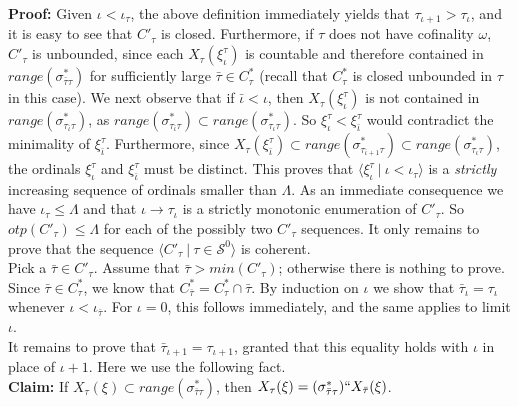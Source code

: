 \documentclass[12pt]{article}
\begin{document}
\textbf{Proof:}  Given $\iota < \iota_\tau$, the above definition immediately yields that $\tau_{\iota + 1} > \tau_\iota$, and it is easy to see that $C'_\tau$ is closed.  Furthermore, if $\tau$ does not have cofinality $\omega$, $C'_\tau$ is unbounded, since each $X_\tau ( \xi_\iota^\tau )$ is countable and therefore contained in $range ( \sigma_{\bar{\tau} \tau }^* )$ for sufficiently large $\bar{\tau} \in C_\tau^*$ (recall that $C_\tau^*$ is closed unbounded in $\tau$ in this case).  We next observe that if $\bar{\iota} < \iota$, then $X_\tau ( \xi_\iota^\tau )$ is not contained in $range ( \sigma^*_{\tau_{\bar{\iota}} \tau})$, as $range ( \sigma^*_{\tau_{\bar{\iota}} \tau}) \subset range ( \sigma^*_{\tau_\iota \tau})$.  So $\xi_\iota^\tau < \xi_{\bar{\iota}}^\tau$ would contradict the minimality of $\xi_{\bar{\iota}}^\tau$.  Furthermore, since $X_\tau ( \xi_{\bar{\iota}}^\tau) \subset range ( \sigma^*_{\tau_{\bar{\iota} + 1} \tau}) \subset range ( \sigma^*_{\tau_\iota \tau})$, the ordinals $\xi_\iota^\tau$ and $\xi_{\bar{\iota}}^\tau$ must be distinct.  This proves that $\langle \xi_\iota^\tau \ | \ \iota < \iota_\tau \rangle$ is a \textit{strictly} increasing sequence of ordinals smaller than $\Lambda$.  As an immediate consequence we have $\iota_\tau \leq \Lambda$ and that $\iota \longrightarrow \tau_\iota$ is a strictly monotonic enumeration of $C'_\tau$.  So $otp (C'_\tau) \leq \Lambda$ for each of the possibly two $C'_\tau$ sequences.  It only remains to prove that the sequence $\langle C'_\tau \ | \ \tau \in \mathcal{S}^0 \rangle$ is coherent.\\

Pick a $\bar{\tau} \in C'_\tau$.  Assume that $\bar{\tau} > min (C'_\tau )$; otherwise there is nothing to prove.  Since $\bar{\tau} \in C_\tau^*$, we know that $C_{\bar{\tau}}^* = C_\tau^* \cap \bar{\tau}$.  By induction on $\iota$ we show that $\bar{\tau}_\iota = \tau_\iota$ whenever $\iota < \iota_{\bar{\tau}}$.  For $\iota = 0$, this follows immediately, and the same applies to limit $\iota$.\\

It remains to prove that $\bar{\tau}_{\iota + 1} = \tau_{\iota + 1}$, granted that this equality holds with $\iota$ in place of $\iota + 1$.  Here we use the following fact.\\

\textbf{Claim:}  If $X_\tau (\xi) \subset range ( \sigma_{\bar{\tau} \tau}^* )$, then $X_\tau (\xi) = ( \sigma_{\bar{\tau} \tau}^* )`` X_{\bar{\tau}} (\xi )$.\\
\end{document}

